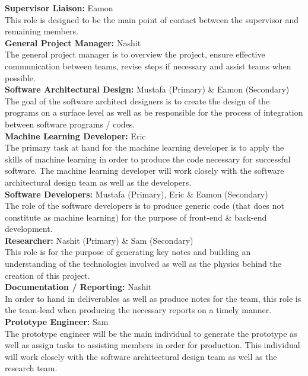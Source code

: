 \documentclass[12pt,a4]{report}
\begin{document}
\noindent \textbf{Supervisor Liaison:} Eamon\\
This role is designed to be the main point of contact between the supervisor and remaining members.\\

\noindent \textbf{General Project Manager:} Nashit\\
The general project manager is to overview the project, ensure effective communication between teams, revise steps if necessary and assist teams when possible.\\

\noindent \textbf{Software Architectural Design:} Mustafa (Primary) \& Eamon (Secondary)\\
The goal of the software architect designers is to create the design of the programs on a surface level as well as be responsible for the process of integration between software programs / codes.\\

\noindent \textbf{Machine Learning Developer:} Eric\\
The primary task at hand for the machine learning developer is to apply the skills of machine learning in order to produce the code necessary for successful software. The machine learning developer will work closely with the software architectural design team as well as the developers.\\

\noindent \textbf{Software Developers:} Mustafa (Primary), Eric \& Eamon (Secondary)\\
The role of the software developers is to produce generic code (that does not constitute as machine learning) for the purpose of front-end \& back-end development.\\

\noindent \textbf{Researcher:} Nashit (Primary) \& Sam (Secondary)\\
This role is for the purpose of generating key notes and building an understanding of the technologies involved as well as the physics behind the creation of this project.\\

\noindent \textbf{Documentation / Reporting:} Nashit\\
In order to hand in deliverables as well as produce notes for the team, this role is the team-lead when producing the necessary reports on a timely manner.\\

\noindent \textbf{Prototype Engineer:} Sam\\
The prototype engineer will be the main individual to generate the prototype as well as assign tasks to assisting members in order for production. This individual will work closely with the software architectural design team as well as the research team.
\end{document}
